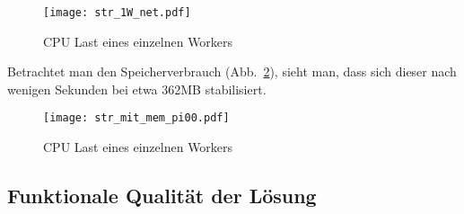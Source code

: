 \begin{figure}[ht!]
	\centering
	\texttt{[image: str\_1W\_net.pdf]}
	\caption{CPU Last eines einzelnen Workers}
	\label{figure:str_1W_net}
\end{figure}

Betrachtet man den Speicherverbrauch (Abb.~\ref{figure:str_mit_mem_pi00}), sieht man, dass sich dieser nach wenigen Sekunden bei etwa 362MB stabilisiert.

\begin{figure}[ht!]
	\centering
	\texttt{[image: str\_mit\_mem\_pi00.pdf]}
	\caption{CPU Last eines einzelnen Workers}
	\label{figure:str_mit_mem_pi00}
\end{figure}

\subsection{Funktionale Qualität der Lösung}
